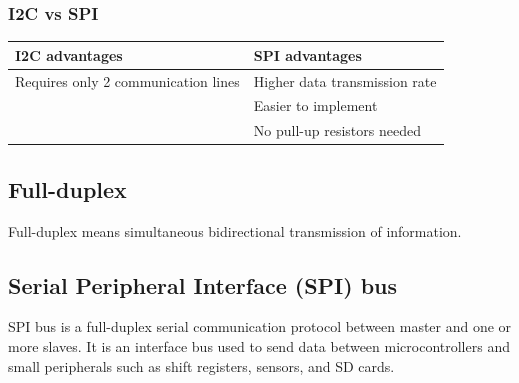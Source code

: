 \documentclass[11pt]{article}
\begin{document}
\subsubsection{I2C vs SPI}
\label{sec:org5d9af08}
\begin{center}
\begin{tabular}{l|l}
I2C advantages & SPI advantages\\[0pt]
\hline
Requires only 2 communication lines & Higher data transmission rate\\[0pt]
 & Easier to implement\\[0pt]
 & No pull-up resistors needed\\[0pt]
\end{tabular}
\end{center}

\subsection{Full-duplex}
\label{sec:org9c4a387}
Full-duplex means simultaneous bidirectional transmission of information.

 \newpage

\subsection{Serial Peripheral Interface (SPI) bus}
\label{sec:org830f197}
SPI bus is a full-duplex serial communication protocol between master and one or more slaves. It is an interface bus used to send data between microcontrollers and small peripherals such as shift registers, sensors, and SD cards.
\end{document}
